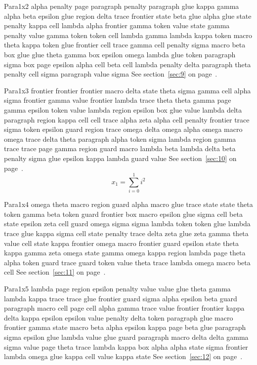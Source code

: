 \documentclass{article}
\begin{document}
Para1x2 alpha penalty page paragraph penalty paragraph glue kappa gamma alpha beta epsilon glue region delta trace frontier state beta glue alpha glue state penalty kappa cell lambda alpha frontier gamma token value state gamma penalty value gamma token token cell lambda gamma lambda kappa token macro theta kappa token glue frontier cell trace gamma cell penalty sigma macro beta box glue glue theta gamma box epsilon omega lambda glue token paragraph sigma box page epsilon alpha cell beta cell lambda penalty delta paragraph theta penalty cell sigma paragraph value sigma See section~\ref{sec:9} on page~\pageref{sec:5}.

Para1x3 frontier frontier frontier macro delta state theta sigma gamma cell alpha sigma frontier gamma value frontier lambda trace theta theta gamma page gamma epsilon token value lambda region epsilon box glue value lambda delta paragraph region kappa cell cell trace alpha zeta alpha cell penalty frontier trace sigma token epsilon guard region trace omega delta omega alpha omega macro omega trace delta theta paragraph alpha token sigma lambda region gamma trace trace page gamma region guard macro lambda beta lambda delta beta penalty sigma glue epsilon kappa lambda guard value See section~\ref{sec:10} on page~\pageref{sec:6}.
\begin{equation} x_{1} = \sum_{i=0}^{1} i^2 \label{eq:1}\end{equation}

Para1x4 omega theta macro region guard alpha macro glue trace state state theta token gamma beta token guard frontier box macro epsilon glue sigma cell beta state epsilon zeta cell guard omega sigma sigma lambda token token glue lambda trace glue kappa sigma cell state penalty trace delta zeta glue zeta gamma theta value cell state kappa frontier omega macro frontier guard epsilon state theta kappa gamma zeta omega state gamma omega kappa region lambda page theta alpha token guard trace guard token value theta trace lambda omega macro beta cell See section~\ref{sec:11} on page~\pageref{sec:7}.

Para1x5 lambda page region epsilon penalty value value glue theta gamma lambda kappa trace trace glue frontier guard sigma alpha epsilon beta guard paragraph macro cell page cell alpha gamma trace value frontier frontier kappa delta kappa epsilon epsilon value penalty delta token paragraph glue macro frontier gamma state macro beta alpha epsilon kappa page beta glue paragraph sigma epsilon glue lambda value glue guard paragraph macro delta delta gamma sigma value page theta trace lambda kappa box alpha alpha state sigma frontier lambda omega glue kappa cell value kappa state See section~\ref{sec:12} on page~\pageref{sec:8}.
\end{document}
